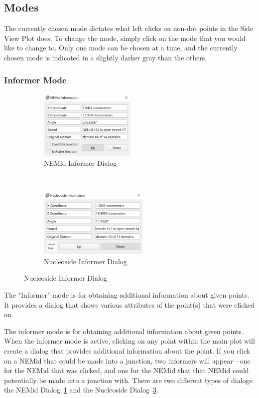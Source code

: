 \documentclass[
titlepage,
fontsize=12pt
]{article}
\begin{document}
	\subsection{Modes}
	The currently chosen mode dictates what left clicks on non-dot points in the Side View Plot does. To change the mode, simply click on the mode that you would like to change to. Only one mode can be chosen at a time, and the currently chosen mode is indicated in a slightly darker gray than the others.
	
	\subsubsection{Informer Mode}
	
	\begin{figure}[h]
		\caption{Informer Dialogs}
		\centering
		\begin{subfigure}{.3\textheight}
			\centering
			\includegraphics[height=1.3in]{NEMid-informer.png}
			\caption{NEMid Informer Dialog}
			\label{fig:NEMid-informer}
		\end{subfigure}%
		~
		\begin{subfigure}{.3\textheight}
			\centering
			\includegraphics[height=1.3in]{nucleoside-informer.png}
			\caption{Nucleoside Informer Dialog}
			\label{fig:nucleoside-informer}
		\end{subfigure}
	\end{figure}
	
	The "Informer" mode is for obtaining additional information about given points. It provides a dialog that shows various attributes of the point(s) that were clicked on.

	The informer mode is for obtaining additional information about given points. When the informer mode is active, clicking on any point within the main plot will create a dialog that provides additional information about the point. If you click on a NEMid that could be made into a junction, two informers will appear---one for the NEMid that was clicked, and one for the NEMid that that NEMid could potentially be made into a junction with. There are two different types of dialogs: the NEMid Dialog~\ref{fig:NEMid-informer} and the Nucleoside Dialog~\ref{fig:nucleoside-informer}.
	
\end{document}

